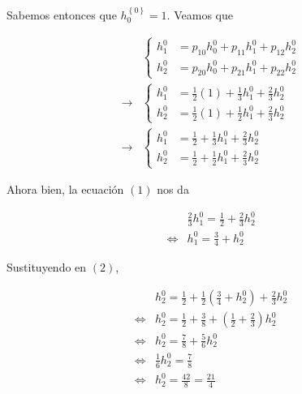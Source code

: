 \documentclass[a4paper, 12pt]{article}
\begin{document}
Sabemos entonces que $h_0^{\left\{ 0 \right\} } = 1$. Veamos que 

\begin{align*}
    &\begin{cases}
        h_1^0 &= p_{1 0} h_{0}^{0} + p_{11}h_{1}^0 + p_{12} h_2^0\\
        h_2^0 &= p_{2 0} h_{0}^{0} + p_{21}h_{1}^0 + p_{22} h_2^0
    \end{cases} \\ 
    \to &\begin{cases}
        h_1^0 &= \frac{1}{2}(1) + \frac{1}{3}h_1^0 + \frac{2}{3}h_2^0\\
        h_2^0 &= \frac{1}{2}(1) + \frac{1}{2}h_{1}^0 + \frac{2}{3} h_2^0
    \end{cases}\\
    \to &\begin{cases}
        h_1^0 &= \frac{1}{2} + \frac{1}{3}h_1^0 + \frac{2}{3}h_2^0\\
        h_2^0 &= \frac{1}{2} + \frac{1}{2}h_{1}^0 + \frac{2}{3} h_2^0
    \end{cases}
\end{align*}

Ahora bien, la ecuación $(1)$ nos da

\begin{align*}
    &\frac{2}{3}h_1^0 = \frac{1}{2} + \frac{2}{3}h_2^0  \\ 
    \iff & h_1^0 = \frac{3}{4} + h_2^0
\end{align*}

Sustituyendo en $(2)$, 

\begin{align*}
    &h_2^0 = \frac{1}{2} + \frac{1}{2}\left( \frac{3}{4} + h_2^0 \right)  +
    \frac{2}{3}h_2^0 \\ 
    \iff& h_2^0 = \frac{1}{2} + \frac{3}{8} + \left( \frac{1}{2} + \frac{2}{3}
    \right) h_2^0 \\ 
        \iff& h_2^0 = \frac{7}{8} + \frac{5}{6}h_2^0 \\ 
        \iff& \frac{1}{6} h_2^0 = \frac{7}{8} \\ 
        \iff& h_2^0 = \frac{42}{8} = \frac{21}{4}
\end{align*}
\end{document}
